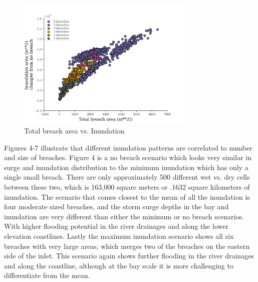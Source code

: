 \documentclass{coastal_paper}
\begin{document}
\begin{figure}
    \centering
    \includegraphics[width=0.75\textwidth]{images/inundation_x_total_breach_area.png}
    \caption{Total breach area vs. Inundation}
    \label{fig3}
\end{figure}

Figures 4-7 illustrate that different inundation patterns are correlated to number and size of breaches. Figure 4 is a no breach scenario which looks very similar in surge and inundation distribution to the minimum inundation which has only a single small breach. There are only approximately 500 different wet vs. dry cells between these two, which is 163,000 square meters or .1632 square kilometers of inundation. The scenario that comes closest to the mean of all the inundation is four moderate sized breaches, and the storm surge depths in the bay and inundation are very different than either the minimum or no breach scenarios. With higher flooding potential in the river drainages and along the lower elevation coastlines. Lastly the maximum inundation scenario shows all six breaches with very large areas, which merges two of the breaches on the eastern side of the inlet. This scenario again shows further flooding in the river drainages and along the coastline, although at the bay scale it is more challenging to differentiate from the mean.
\end{document}
